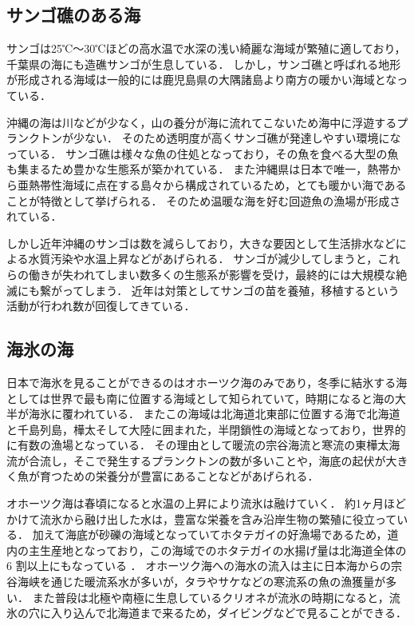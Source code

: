 \documentclass[12pt,a4j,titlepage]{ltjsarticle}
\begin{document}
\subsection{サンゴ礁のある海}
サンゴは25℃〜30℃ほどの高水温で水深の浅い綺麗な海域が繁殖に適しており，千葉県の海にも造礁サンゴが生息している．
しかし，サンゴ礁と呼ばれる地形が形成される海域は一般的には鹿児島県の大隅諸島より南方の暖かい海域となっている．\par
沖縄の海は川などが少なく，山の養分が海に流れてこないため海中に浮遊するプランクトンが少ない\cite{okinawa}．
そのため透明度が高くサンゴ礁が発達しやすい環境になっている．
サンゴ礁は様々な魚の住処となっており，その魚を食べる大型の魚も集まるため豊かな生態系が築かれている．
また沖縄県は日本で唯一，熱帯から亜熱帯性海域に点在する島々から構成されているため，とても暖かい海であることが特徴として挙げられる．
そのため温暖な海を好む回遊魚の漁場が形成されている．\par
しかし近年沖縄のサンゴは数を減らしており，大きな要因として生活排水などによる水質汚染や水温上昇などがあげられる．
サンゴが減少してしまうと，これらの働きが失われてしまい数多くの生態系が影響を受け，最終的には大規模な絶滅にも繋がってしまう．
近年は対策としてサンゴの苗を養殖，移植するという活動が行われ数が回復してきている．
\subsection{海氷の海}
日本で海氷を見ることができるのはオホーツク海のみであり，冬季に結氷する海としては世界で最も南に位置する海域として知られていて，時期になると海の大半が海氷に覆われている．
またこの海域は北海道北東部に位置する海で北海道と千島列島，樺太そして大陸に囲まれた，半閉鎖性の海域となっており，世界的に有数の漁場となっている\cite{ohotuku}．
その理由として暖流の宗谷海流と寒流の東樺太海流が合流し，そこで発生するプランクトンの数が多いことや，海底の起伏が大きく魚が育つための栄養分が豊富にあることなどがあげられる．\par
オホーツク海は春頃になると水温の上昇により流氷は融けていく．
約1ヶ月ほどかけて流氷から融け出した水は，豊富な栄養を含み沿岸生物の繁殖に役立っている．
加えて海底が砂礫の海域となっていてホタテガイの好漁場であるため，道内の主生産地となっており，この海域でのホタテガイの水揚げ量は北海道全体の 6 割以上にもなっている ．
オホーツク海への海水の流入は主に日本海からの宗谷海峡を通じた暖流系水が多いが，タラやサケなどの寒流系の魚の漁獲量が多い．
また普段は北極や南極に生息しているクリオネが流氷の時期になると，流氷の穴に入り込んで北海道まで来るため，ダイビングなどで見ることができる．
\clearpage
\end{document}
